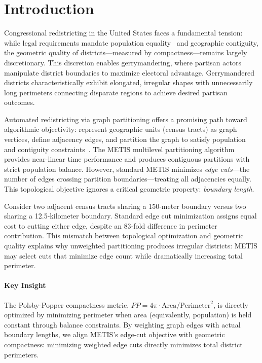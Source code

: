 \section{Introduction}

Congressional redistricting in the United States faces a fundamental tension: while legal requirements mandate population equality~\cite{reynolds-v-sims} and geographic contiguity, the geometric quality of districts—measured by compactness—remains largely discretionary. This discretion enables gerrymandering, where partisan actors manipulate district boundaries to maximize electoral advantage. Gerrymandered districts characteristically exhibit elongated, irregular shapes with unnecessarily long perimeters connecting disparate regions to achieve desired partisan outcomes.

Automated redistricting via graph partitioning offers a promising path toward algorithmic objectivity: represent geographic units (census tracts) as graph vertices, define adjacency edges, and partition the graph to satisfy population and contiguity constraints~\cite{duchin2018outlier,chen2013redistricting}. The METIS multilevel partitioning algorithm~\cite{karypis1998metis} provides near-linear time performance and produces contiguous partitions with strict population balance. However, standard METIS minimizes \textit{edge cuts}—the number of edges crossing partition boundaries—treating all adjacencies equally. This topological objective ignores a critical geometric property: \textit{boundary length}.

Consider two adjacent census tracts sharing a 150-meter boundary versus two sharing a 12.5-kilometer boundary. Standard edge cut minimization assigns equal cost to cutting either edge, despite an 83-fold difference in perimeter contribution. This mismatch between topological optimization and geometric quality explains why unweighted partitioning produces irregular districts: METIS may select cuts that minimize edge count while dramatically increasing total perimeter.

\paragraph{Key Insight} The Polsby-Popper compactness metric, $PP = 4\pi \cdot \text{Area} / \text{Perimeter}^2$, is directly optimized by minimizing perimeter when area (equivalently, population) is held constant through balance constraints. By weighting graph edges with actual boundary lengths, we align METIS's edge-cut objective with geometric compactness: minimizing weighted edge cuts directly minimizes total district perimeters.

